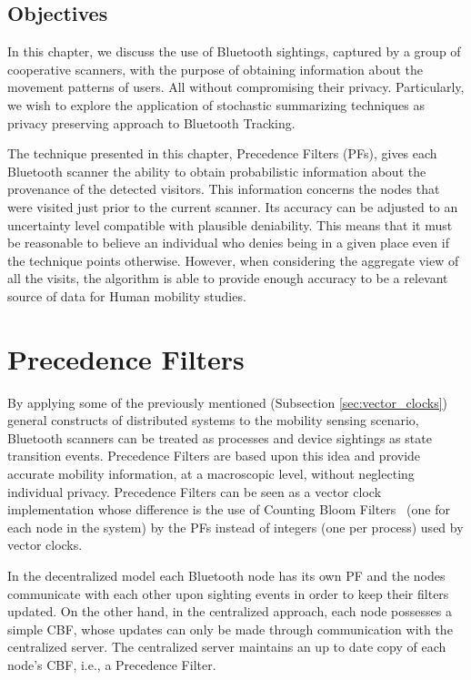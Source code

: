 \subsection{Objectives}
\label{sec:ct-objectives}
In this chapter, we discuss the use of Bluetooth sightings, captured
by a group of cooperative scanners, with the purpose of obtaining
information about the movement patterns of users. All without
compromising their privacy. Particularly, we wish to explore the
application of stochastic summarizing techniques as privacy preserving
approach to Bluetooth Tracking.

The technique presented in this chapter, Precedence Filters (PFs), gives
each Bluetooth scanner the ability to obtain probabilistic information
about the provenance of the detected visitors. This information
concerns the nodes that were visited just prior to the current
scanner. Its accuracy can be adjusted to an uncertainty level
compatible with plausible deniability. This means that it must be
reasonable to believe an individual who denies being in a given place
even if the technique points otherwise.
However, when considering the aggregate view of all the visits, the
algorithm is able to provide enough accuracy to be a relevant source
of data for Human mobility studies.

\section{Precedence Filters}
\label{sec:precedence-filters}
By applying some of the previously mentioned (Subsection
\ref{sec:vector_clocks}) general constructs of distributed systems to
the mobility sensing scenario, Bluetooth scanners can be treated as
processes and device sightings as state transition events. Precedence
Filters are based upon this idea and provide accurate mobility
information, at a macroscopic level, without neglecting individual
privacy.  Precedence Filters can be seen as a vector clock
\cite{Fidge,Mattern} implementation whose difference is the use of
Counting Bloom Filters~\cite{Fan98summarycache:,Mitzenmacher:2002:CBF:581876.581878} (one for each node in the system) by the PFs
instead of integers (one per process) used by vector clocks.

In the decentralized model each Bluetooth node has its own PF and the
nodes communicate with each other upon sighting events in order to
keep their filters updated. On the other hand, in the centralized
approach, each node possesses a simple CBF, whose updates can only be
made through communication with the centralized server.  The
centralized server maintains an up to date copy of each node's CBF,
i.e., a Precedence Filter.

